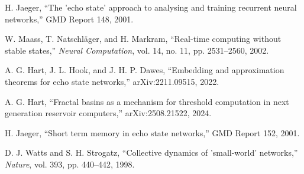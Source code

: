 \documentclass{article}
\begin{document}
\begin{thebibliography}{9}

H. Jaeger, ``The 'echo state' approach to analysing and training recurrent neural networks,'' GMD Report 148, 2001.

W. Maass, T. Natschläger, and H. Markram, ``Real-time computing without stable states,'' \emph{Neural Computation}, vol. 14, no. 11, pp. 2531--2560, 2002.

A. G. Hart, J. L. Hook, and J. H. P. Dawes, ``Embedding and approximation theorems for echo state networks,'' arXiv:2211.09515, 2022.

A. G. Hart, ``Fractal basins as a mechanism for threshold computation in next generation reservoir computers,'' arXiv:2508.21522, 2024.

H. Jaeger, ``Short term memory in echo state networks,'' GMD Report 152, 2001.

D. J. Watts and S. H. Strogatz, ``Collective dynamics of 'small-world' networks,'' \emph{Nature}, vol. 393, pp. 440--442, 1998.

\end{thebibliography}
\end{document}
